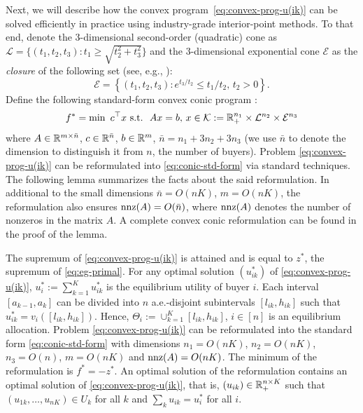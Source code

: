 Next, we will describe how the convex program~\ref{eq:convex-prog-u(ik)} can be solved efficiently in practice using industry-grade interior-point methods.
To that end, denote the $3$-dimensional second-order (quadratic) cone as $\mathcal{L} = \{ (t_1, t_2, t_3): t_1 \geq \sqrt{t_2^2+t_3^2} \}$ and the $3$-dimensional exponential cone $\mathcal{E}$ as the \textit{closure} of the following set (see, e.g., \cite{chares2009cones}): 
\[ \mathcal{E}  = \left\{ (t_1, t_2, t_3): e^{t_3/t_2} \leq t_1/t_2,\, t_2 >0 \right\}. \]
Define the following standard-form convex conic program \citep{skajaa2015homogeneous,dahl2019primal,nemirovski2004interior}:
\begin{align}
	\begin{split}
		f^* = \min\ c^\top x \ {\rm s.t.}\  \ Ax = b,\,  x\in \mathcal{K}:= \mathbb{R}_+^{n_1} \times \mathcal{L}^{n_2} \times \mathcal{E}^{n_3}
	\end{split} \label{eq:conic-std-form}
\end{align}
where $A\in \mathbb{R}^{m\times \bar{n}}$, $c\in \mathbb{R}^{\bar{n}}$, $b\in \mathbb{R}^m$, $\bar{n} = n_1 + 3n_2 + 3n_3$ (we use $\bar{n}$ to denote the dimension to distinguish it from $n$, the number of buyers). 
Problem \eqref{eq:convex-prog-u(ik)} can be reformulated into \eqref{eq:conic-std-form} via standard techniques. 
The following lemma summarizes the facts about the said reformulation. 
In additional to the small dimensions $\bar{n} = O(nK)$, $m=O(nK)$, the reformulation also ensures ${\rm nnz}(A) = O(\bar{n})$, where ${\rm nnz}(A)$ denotes the number of nonzeros in the matrix $A$. A complete convex conic reformulation can be found in the proof of the lemma.
\begin{theorem}
	The supremum of \eqref{eq:convex-prog-u(ik)} is attained and is equal to $z^*$, the supremum of \eqref{eq:eg-primal}.
	For any optimal solution $(u^*_{ik})$ of \eqref{eq:convex-prog-u(ik)}, $u^*_i := \sum_{k=1}^K u^*_{ik}$ is the equilibrium utility of buyer $i$. 
	Each interval $[a_{k-1}, a_k]$ can be divided into $n$ a.e.-disjoint subintervals $[l_{ik}, h_{ik}]$ such that $u^*_{ik} = v_i([l_{ik}, h_{ik}])$. Hence, $\Theta_i := \cup_{k=1}^K [l_{ik}, h_{ik}]$, $i\in[n]$ is an equilibrium allocation. 
	Problem \eqref{eq:convex-prog-u(ik)} can be reformulated into the standard form \eqref{eq:conic-std-form} with dimensions $n_1 = O(nK)$, $n_2 = O(nK)$, $n_3 = O(n)$, $m = O(nK)$ and ${\rm nnz}(A) = O(nK)$. The minimum of the reformulation is $f^* = -z^*$.
	An optimal solution of the reformulation contains an optimal solution of \eqref{eq:convex-prog-u(ik)}, that is, $(u_{ik})\in \mathbb{R}_+^{n\times K}$ such that $(u_{1k}, \dots, u_{nK})\in U_k$ for all $k$ and $\sum_k u_{ik} = u^*_i$ for all $i$.
 	 \label{lemma:eg=>u(ik)-facts}
\end{theorem}

